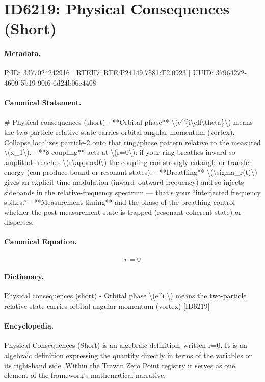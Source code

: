 \section*{ID6219: Physical Consequences (Short)}
\paragraph{Metadata.}
PiID: 3377024242916 | RTEID: RTE:P24149.7581:T2.0923 | UUID: 37964272-4609-5b19-90f6-6d24b06e4408

\paragraph{Canonical Statement.}
\# Physical consequences (short) - **Orbital phase** \textbackslash{}(e\textasciicircum{}\{i\textbackslash{}ell\textbackslash{}theta\}\textbackslash{}) means the two-particle relative state carries orbital angular momentum (vortex). Collapse localizes particle-2 onto that ring/phase pattern relative to the measured \textbackslash{}(x\_1\textbackslash{}). - **δ-coupling** acts at \textbackslash{}(r=0\textbackslash{}): if your ring breathes inward so amplitude reaches \textbackslash{}(r\textbackslash{}approx0\textbackslash{}) the coupling can strongly entangle or transfer energy (can produce bound or resonant states). - **Breathing** \textbackslash{}(\textbackslash{}sigma\_r(t)\textbackslash{}) gives an explicit time modulation (inward–outward frequency) and so injects sidebands in the relative-frequency spectrum — that’s your “interjected frequency spikes.” - **Measurement timing** and the phase of the breathing control whether the post-measurement state is trapped (resonant coherent state) or disperses.

\paragraph{Canonical Equation.}
\[
r=0
\]

\paragraph{Dictionary.}
Physical consequences (short) - Orbital phase \textbackslash{}(e\textasciicircum{}i \textbackslash{}) means the two-particle relative state carries orbital angular momentum (vortex) [ID6219]

\paragraph{Encyclopedia.}
Physical Consequences (Short) is an algebraic definition, written r=0. It is an algebraic definition expressing the quantity directly in terms of the variables on its right-hand side. Within the Trawin Zero Point registry it serves as one element of the framework's mathematical narrative.

